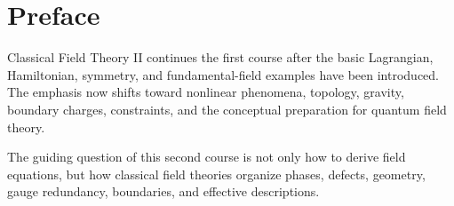 \chapter*{Preface}

Classical Field Theory II continues the first course after the basic
Lagrangian, Hamiltonian, symmetry, and fundamental-field examples have been
introduced. The emphasis now shifts toward nonlinear phenomena, topology,
gravity, boundary charges, constraints, and the conceptual preparation for
quantum field theory.

\begin{remarkbox}
The guiding question of this second course is not only how to derive field
equations, but how classical field theories organize phases, defects, geometry,
gauge redundancy, boundaries, and effective descriptions.
\end{remarkbox}
